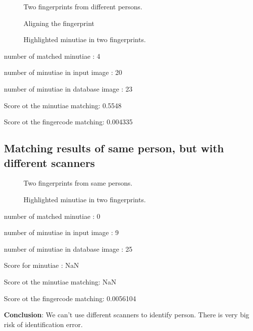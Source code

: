 \documentclass{article}
\begin{document}
\begin{figure}[htbp]
  \centering
  \def\svgscale{0.3}
  
  \caption{Two fingerprints from different persons.}
\end{figure}
\newpage

\begin{figure}[htbp]
  \centering
  \def\svgscale{0.5}
  
  \caption{Aligning the fingerprint}
\end{figure}

\begin{figure}[htbp]
  \def\svgscale{0.5}
  
  \def\svgscale{0.5}
  
  \caption{Highlighted minutiae in two fingerprints.}
\end{figure}

number of matched minutiae : 4

number of minutiae in input image : 20

number of minutiae in database image : 23

Score ot the minutiae matching: 0.5548

Score ot the fingercode matching: 0.004335

\newpage
\subsection{Matching results of same person, but with different scanners}

\begin{figure}[htbp]
  \centering
  \def\svgscale{0.3}
  
  \caption{Two fingerprints from same persons.}
\end{figure}

\begin{figure}[htbp]
  \def\svgscale{0.5}
  
  \def\svgscale{0.5}
  
  \caption{Highlighted minutiae in two fingerprints.}
\end{figure}

number of matched minutiae : 0

number of minutiae in input image : 9

number of minutiae in database image : 25

Score for minutiae : NaN

Score ot the minutiae matching: NaN

Score ot the fingercode matching: 0.0056104

\textbf{Conclusion}: We can't use different scanners to identify person. There is very big risk of identification error.
\end{document}
